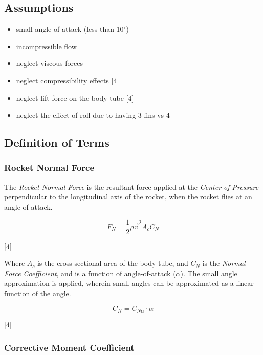 \documentclass[]{article}
\providecommand{\tightlist}{%
  \setlength{\itemsep}{0pt}\setlength{\parskip}{0pt}}
\begin{document}
\subsection{Assumptions}\label{assumptions-2}

\begin{itemize}
\tightlist
\item
  small angle of attack (less than 10\(^\circ\))
\item
  incompressible flow
\item
  neglect viscous forces
\item
  neglect compressibility effects {[}4{]}
\item
  neglect lift force on the body tube {[}4{]}
\item
  neglect the effect of roll due to having 3 fins vs 4
\end{itemize}

\subsection{Definition of Terms}\label{definition-of-terms}

\subsubsection{Rocket Normal Force}\label{rocket-normal-force}

The \emph{Rocket Normal Force} is the resultant force applied at the
\emph{Center of Pressure} perpendicular to the longitudinal axis of the
rocket, when the rocket flies at an angle-of-attack.

\begin{equation}
\label{rocket_normal_force}
F_{N} = \dfrac{1}{2} \rho \vec{v}^2 A_{c} C_N
\end{equation}

{[}4{]}

Where \(A_c\) is the cross-sectional area of the body tube, and \(C_N\)
is the \emph{Normal Force Coefficient}, and is a function of
angle-of-attack (\(\alpha\)). The small angle approximation is applied,
wherein small angles can be approximated as a linear function of the
angle.

\begin{equation}
\label{normal_force_coefficient}
C_N = C_{N \alpha} \cdot \alpha
\end{equation}

{[}4{]}

\subsubsection{Corrective Moment
Coefficient}\label{corrective-moment-coefficient}
\end{document}
